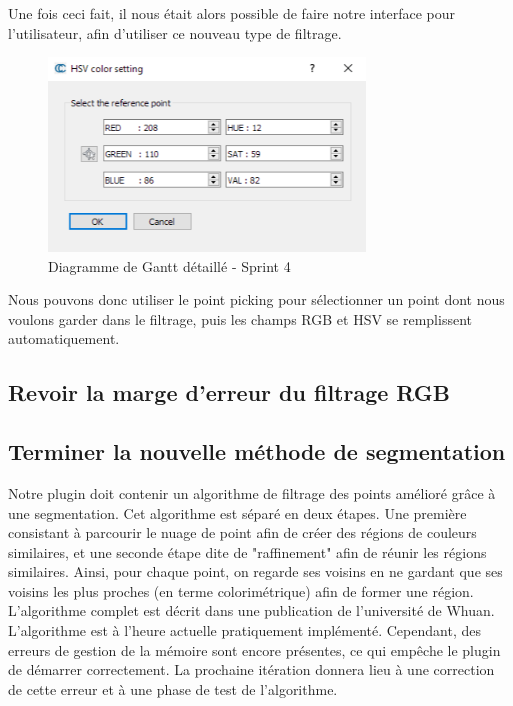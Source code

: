 \documentclass[12pt,titlepage,french]{article}
\begin{document}
Une fois ceci fait, il nous était alors possible de faire notre interface pour l'utilisateur, afin d'utiliser ce nouveau type de filtrage.

\begin{figure}[!hbtp]
 \caption{\label{} Diagramme de Gantt détaillé - Sprint 4}
 \begin{center}
 \includegraphics[width=0.75\textwidth]{./img/ui_hsv.PNG}
  \end{center}
\end{figure}

Nous pouvons donc utiliser le point picking pour sélectionner un point dont nous voulons garder dans le filtrage, puis les champs RGB et HSV se remplissent automatiquement. \newline


\subsection{Revoir la marge d'erreur du filtrage RGB}

\subsection{Terminer la nouvelle méthode de segmentation}

Notre plugin doit contenir un algorithme de filtrage des points amélioré grâce à une segmentation. Cet algorithme est séparé en deux étapes. Une première consistant à parcourir le nuage de point afin de créer des régions de couleurs similaires, et une seconde étape dite de "raffinement" afin de réunir les régions similaires. \newline
Ainsi, pour chaque point, on regarde ses voisins en ne gardant que ses voisins les plus proches (en terme colorimétrique) afin de former une région. L'algorithme complet est décrit dans une publication de l'université de \cite{B01} Whuan. 
L'algorithme est à l'heure actuelle pratiquement implémenté. Cependant, des erreurs de gestion de la mémoire sont encore présentes, ce qui empêche le plugin de démarrer correctement. La prochaine itération donnera lieu à une correction de cette erreur et à une phase de test de l'algorithme.
\end{document}
